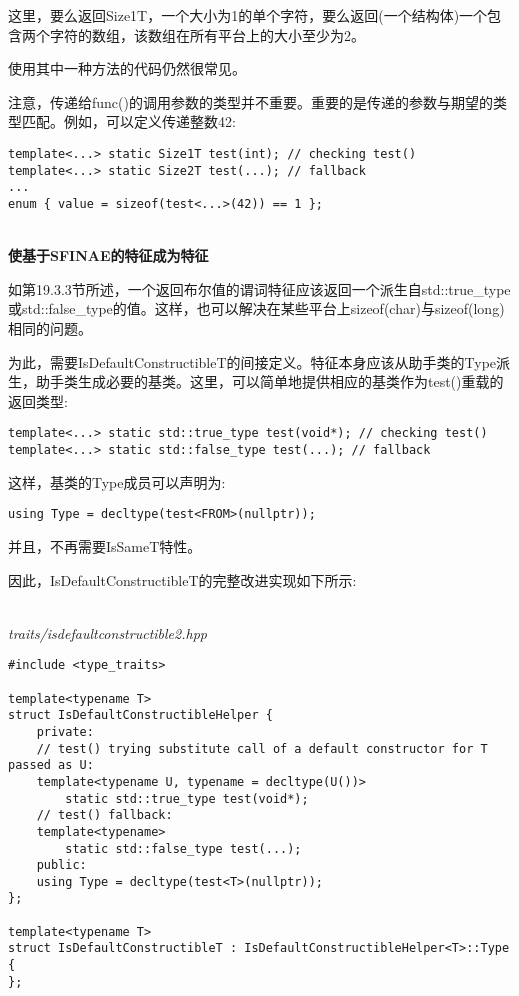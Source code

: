 这里，要么返回Size1T，一个大小为1的单个字符，要么返回(一个结构体)一个包含两个字符的数组，该数组在所有平台上的大小至少为2。

使用其中一种方法的代码仍然很常见。

注意，传递给func()的调用参数的类型并不重要。重要的是传递的参数与期望的类型匹配。例如，可以定义传递整数42:

\begin{lstlisting}[style=styleCXX]
template<...> static Size1T test(int); // checking test()
template<...> static Size2T test(...); // fallback
...
enum { value = sizeof(test<...>(42)) == 1 };
\end{lstlisting}

\hspace*{\fill} \\ %
\noindent
\textbf{使基于SFINAE的特征成为特征}

如第19.3.3节所述，一个返回布尔值的谓词特征应该返回一个派生自std::true\_type或std::false\_type的值。这样，也可以解决在某些平台上sizeof(char)与sizeof(long)相同的问题。

为此，需要IsDefaultConstructibleT的间接定义。特征本身应该从助手类的Type派生，助手类生成必要的基类。这里，可以简单地提供相应的基类作为test()重载的返回类型:

\begin{lstlisting}[style=styleCXX]
template<...> static std::true_type test(void*); // checking test()
template<...> static std::false_type test(...); // fallback
\end{lstlisting}

这样，基类的Type成员可以声明为:

\begin{lstlisting}[style=styleCXX]
using Type = decltype(test<FROM>(nullptr));
\end{lstlisting}

并且，不再需要IsSameT特性。

因此，IsDefaultConstructibleT的完整改进实现如下所示:

\hspace*{\fill} \\ %
\noindent
\textit{traits/isdefaultconstructible2.hpp}
\begin{lstlisting}[style=styleCXX]
#include <type_traits>

template<typename T>
struct IsDefaultConstructibleHelper {
	private:
	// test() trying substitute call of a default constructor for T passed as U:
	template<typename U, typename = decltype(U())>
		static std::true_type test(void*);
	// test() fallback:
	template<typename>
		static std::false_type test(...);
	public:
	using Type = decltype(test<T>(nullptr));
};

template<typename T>
struct IsDefaultConstructibleT : IsDefaultConstructibleHelper<T>::Type {
};
\end{lstlisting}

